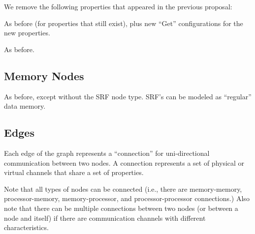 
We remove the following properties that appeared in the previous
proposal: \\



As before (for properties that still exist), plus new ``Get''
configurations for the new properties.


As before.

\subsection{Memory Nodes}

As before, except without the SRF node type.  SRF's can be modeled as
``regular'' data memory.

\subsection{Edges}

Each edge of the graph represents a ``connection'' for uni-directional
communication between two nodes.  A connection represents a set of
physical or virtual channels that share a set of properties.

Note that all types of nodes can be connected (i.e., there are
memory-memory, processor-memory, memory-processor, and
processor-processor connections.)  Also note that there can be
multiple connections between two nodes (or between a node and itself)
if there are communication channels with different characteristics.

